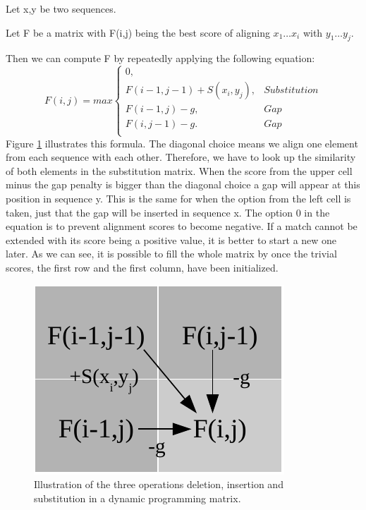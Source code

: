 \begin{definition}
	\item Let x,y be two sequences.
	\item Let F be a matrix with F(i,j) being the best score of aligning $x_1\dots x_i$ with $y_1\dots y_j$.
\end{definition}
Then we can compute F by repeatedly applying the following equation:
\begin{equation}
F(i,j) = max \left\{ \begin{array}{lr}0,&\\F(i-1,j-1)+S(x_i,y_j),&Substitution\\F(i-1,j)-g,&Gap\\F(i,j-1)-g.&Gap\\\end{array} \right.
\end{equation}
Figure \ref{fig:basicalignmentoperations} illustrates this formula.
The diagonal choice means we align one element from each sequence with each other.
Therefore, we have to look up the similarity of both elements in the substitution matrix.
When the score from the upper cell minus the gap penalty is bigger than the diagonal choice a gap will appear at this position in sequence y.
This is the same for when the option from the left cell is taken, just that the gap will be inserted in sequence x.
The option 0 in the equation is to prevent alignment scores to become negative.
If a match cannot be extended with its score being a positive value, it is better to start a new one later.
As we can see, it is possible to fill the whole matrix by once the trivial scores, the first row and the first column, have been initialized.

\begin{figure}
	\centering
	\includegraphics{img/basic_cell_fill.pdf}
	\caption{Illustration of the three operations deletion, insertion and substitution in a dynamic programming matrix.}
	\label{fig:basicalignmentoperations}
\end{figure}

